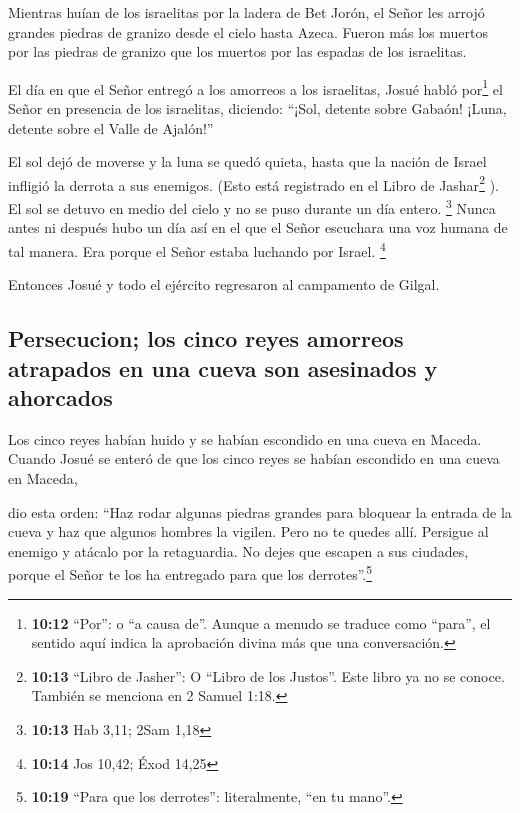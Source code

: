  Mientras huían de los israelitas por la ladera de Bet
Jorón, el Señor les arrojó grandes piedras de granizo desde el cielo
hasta Azeca. Fueron más los muertos por las piedras de granizo que los
muertos por las espadas de los israelitas.

 El día en que el Señor entregó a los amorreos a los
israelitas, Josué habló por\footnote{\textbf{10:12} ``Por'': o ``a causa
  de''. Aunque a menudo se traduce como ``para'', el sentido aquí indica
  la aprobación divina más que una conversación.} el Señor en presencia
de los israelitas, diciendo: ``¡Sol, detente sobre Gabaón! ¡Luna,
detente sobre el Valle de Ajalón!''

 El sol dejó de moverse y la luna se quedó quieta, hasta
que la nación de Israel infligió la derrota a sus enemigos. (Esto está
registrado en el Libro de Jashar\footnote{\textbf{10:13} ``Libro de
  Jasher'': O ``Libro de los Justos''. Este libro ya no se conoce.
  También se menciona en 2 Samuel 1:18.} ). El sol se detuvo en medio
del cielo y no se puso durante un día entero. \footnote{\textbf{10:13}
  Hab 3,11; 2Sam 1,18}  Nunca antes ni después hubo un
día así en el que el Señor escuchara una voz humana de tal manera. Era
porque el Señor estaba luchando por Israel. \footnote{\textbf{10:14} Jos
  10,42; Éxod 14,25}

 Entonces Josué y todo el ejército regresaron al
campamento de Gilgal.

\hypertarget{persecucion-los-cinco-reyes-amorreos-atrapados-en-una-cueva-son-asesinados-y-ahorcados}{%
\subsection{Persecucion; los cinco reyes amorreos atrapados en una cueva
son asesinados y
ahorcados}\label{persecucion-los-cinco-reyes-amorreos-atrapados-en-una-cueva-son-asesinados-y-ahorcados}}

 Los cinco reyes habían huido y se habían escondido en
una cueva en Maceda.  Cuando Josué se enteró de que los
cinco reyes se habían escondido en una cueva en Maceda,

 dio esta orden: ``Haz rodar algunas piedras grandes para
bloquear la entrada de la cueva y haz que algunos hombres la vigilen.
 Pero no te quedes allí. Persigue al enemigo y atácalo
por la retaguardia. No dejes que escapen a sus ciudades, porque el Señor
te los ha entregado para que los derrotes''.\footnote{\textbf{10:19}
  ``Para que los derrotes'': literalmente, ``en tu mano''.}

